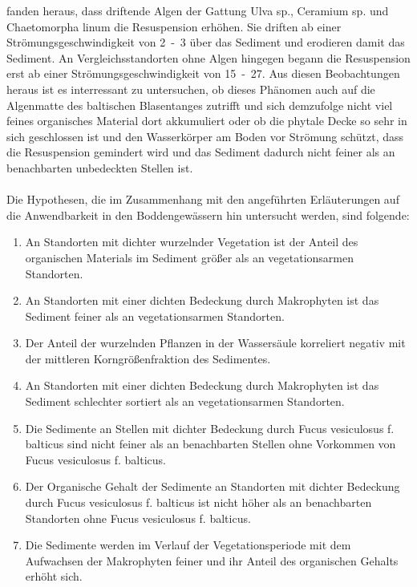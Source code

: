 \cite{canal-verges_2010} fanden heraus, dass driftende Algen der Gattung Ulva sp., Ceramium sp. und Chaetomorpha linum die Resuspension erhöhen. Sie driften ab einer Strömungsgeschwindigkeit von \unit{2-3}{\centi\metre\per\second} über das Sediment und erodieren damit das Sediment. An Vergleichsstandorten ohne Algen hingegen begann die Resuspension erst ab einer Strömungsgeschwindigkeit von \unit{15-27}{\centi\metre\per\second}. Aus diesen Beobachtungen heraus ist es interressant zu untersuchen, ob dieses Phänomen auch auf die Algenmatte des baltischen Blasentanges zutrifft und sich demzufolge nicht viel feines organisches Material dort akkumuliert oder ob die phytale Decke so sehr in sich geschlossen ist und den Wasserkörper am Boden vor Strömung schützt, dass die Resuspension gemindert wird und das Sediment dadurch nicht feiner als an benachbarten unbedeckten Stellen ist.\\
\\
Die Hypothesen, die im Zusammenhang mit den angeführten Erläuterungen auf die Anwendbarkeit in den Boddengewässern hin untersucht werden, sind folgende:
\\

\begin{enumerate}[label=\Roman{*},leftmargin=1.5cm]

\item An Standorten mit dichter wurzelnder Vegetation ist der Anteil des organischen Materials im Sediment größer als an vegetationsarmen Standorten.

\item An Standorten mit einer dichten Bedeckung durch Makrophyten ist das Sediment feiner als an vegetationsarmen Standorten.  

\item Der Anteil der wurzelnden Pflanzen in der Wassersäule korreliert negativ mit der mittleren Korngrößenfraktion des Sedimentes.

\item An Standorten mit einer dichten Bedeckung durch Makrophyten ist das Sediment schlechter sortiert als an vegetationsarmen Standorten.

\item Die Sedimente an Stellen mit dichter Bedeckung durch Fucus vesiculosus f. balticus sind nicht feiner als an benachbarten Stellen ohne Vorkommen von Fucus vesiculosus f. balticus.

\item Der Organische Gehalt der Sedimente an Standorten mit dichter Bedeckung durch Fucus vesiculosus f. balticus ist nicht höher als an benachbarten Standorten ohne Fucus vesiculosus f. balticus. 

\item Die Sedimente werden im Verlauf der Vegetationsperiode mit dem Aufwachsen der Makrophyten feiner und ihr Anteil des organischen Gehalts erhöht sich.

\end{enumerate}


